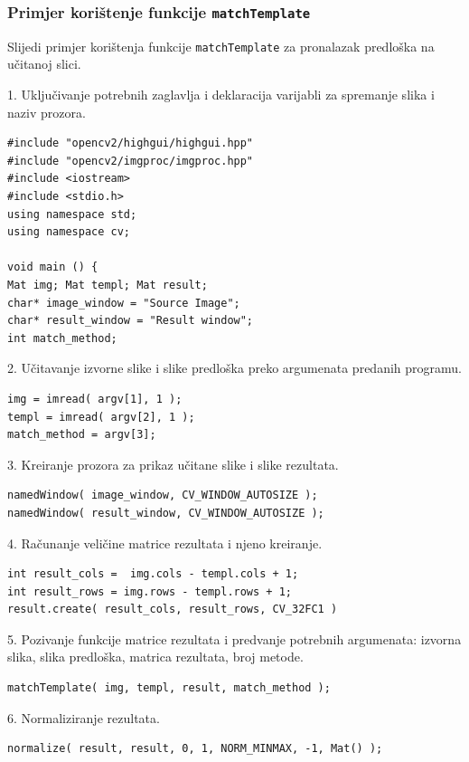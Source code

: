 \newpage
\subsubsection{Primjer korištenje funkcije \texttt{matchTemplate} } %
\label{ssub:Primjer korištenje funkcije }

Slijedi primjer korištenja funkcije \texttt{matchTemplate} za pronalazak
predloška na učitanoj slici.

1. Uključivanje potrebnih zaglavlja i deklaracija varijabli za spremanje
slika i naziv prozora.
\begin{lstlisting}[label=lst1,caption={}]
#include "opencv2/highgui/highgui.hpp"
#include "opencv2/imgproc/imgproc.hpp"
#include <iostream>
#include <stdio.h>
using namespace std;
using namespace cv;

void main () {
Mat img; Mat templ; Mat result;
char* image_window = "Source Image";
char* result_window = "Result window";
int match_method;
\end{lstlisting}

2. Učitavanje izvorne slike i slike predloška preko argumenata predanih
programu.
\begin{lstlisting}[caption={}]
img = imread( argv[1], 1 );
templ = imread( argv[2], 1 );
match_method = argv[3];
\end{lstlisting}

3. Kreiranje prozora za prikaz učitane slike i slike rezultata.
\begin{lstlisting}[caption={}]
namedWindow( image_window, CV_WINDOW_AUTOSIZE );
namedWindow( result_window, CV_WINDOW_AUTOSIZE );
\end{lstlisting}

4. Računanje veličine matrice rezultata i njeno kreiranje.
\begin{lstlisting}[caption={}]
int result_cols =  img.cols - templ.cols + 1;
int result_rows = img.rows - templ.rows + 1;
result.create( result_cols, result_rows, CV_32FC1 )
\end{lstlisting}

5. Pozivanje funkcije matrice rezultata i predvanje potrebnih
argumenata: izvorna slika, slika predloška, matrica rezultata, broj
metode.
\begin{lstlisting}[caption={}]
matchTemplate( img, templ, result, match_method );
\end{lstlisting}

6. Normaliziranje rezultata.
\begin{lstlisting}[caption={}]
normalize( result, result, 0, 1, NORM_MINMAX, -1, Mat() );
\end{lstlisting}

